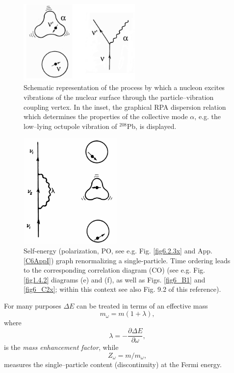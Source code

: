 \begin{figure}[h!]
\centerline {
\includegraphics*[width=6cm]{introduccion/figs/figintroD1}
}
\caption{Schematic representation of the process by which a nucleon excites  vibrations of the nuclear surface through the particle--vibration coupling vertex. In the inset, the graphical RPA dispersion relation which determines the properties of the collective mode $\alpha$,  e.g. the low--lying octupole vibration of $^{208}$Pb, is displayed.}
\label{fig:4.1}
\end{figure}

\begin{figure}[h!]
\centerline {
\includegraphics*[width=5cm]{introduccion/figs/figintroD2}
}
\caption{Self-energy (polarization, PO, see e.g. Fig. \ref{fig6.2.3x} and App. \ref{C6AppI}) graph renormalizing  a single-particle. Time ordering leads to the corresponding correlation diagram (CO) (see e.g. Fig. \ref{fig1.4.2} diagrams (e) and (f), as well as Figs. \ref{fig6_B1} and \ref{fig6_C2x}; within this context see also \cite{Brink:05} Fig. 9.2 of this reference).}
\label{fig:4.2}
\end{figure}
For many purposes $\Delta E$ can be treated in terms of an effective mass
\begin{equation}
m_{\omega} = m(1+\lambda),
\label{eqn:38}
\end{equation}
where
\begin{equation}
\lambda= - \frac{\partial \Delta E}{\partial \omega},
\label{eqn:39}
\end{equation}
is the {\it mass enhancement factor}, while
\begin{equation}
\nonumber
Z_{\omega}=m/m_{\omega},
\end{equation}
measures the single--particle content (discontinuity) at the Fermi energy.


